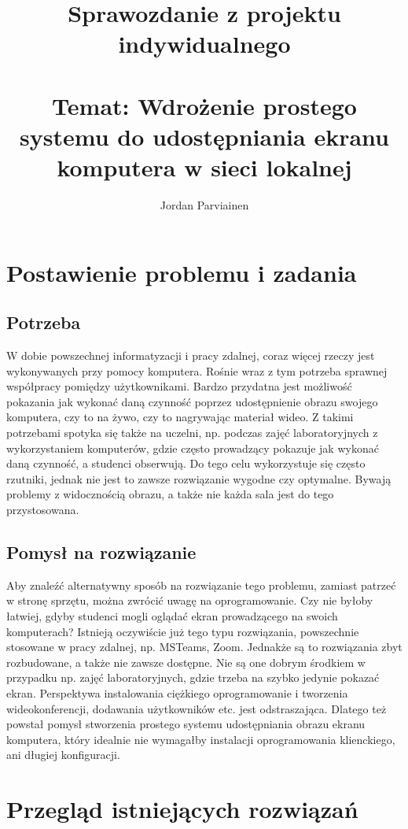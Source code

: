 \documentclass[a4paper,11pt]{article}
\title{%
    Sprawozdanie z projektu indywidualnego \\
    \ \\
    \large{Temat: Wdrożenie prostego systemu do udostępniania ekranu komputera w sieci lokalnej}}
\author{Jordan Parviainen}
\begin{document}
    \maketitle
    \newpage
    \section{Postawienie problemu i zadania}
        \subsection{Potrzeba}
        W dobie powszechnej informatyzacji i pracy zdalnej, coraz więcej rzeczy jest wykonywanych przy pomocy komputera. Rośnie wraz z tym potrzeba sprawnej współpracy pomiędzy użytkownikami.  
        Bardzo przydatna jest możliwość pokazania jak wykonać daną czynność poprzez udostępnienie obrazu swojego komputera, czy to na żywo, czy to nagrywając materiał wideo. 
        Z takimi potrzebami spotyka się także na uczelni, np. podczas zajęć laboratoryjnych z wykorzystaniem komputerów, gdzie często prowadzący pokazuje jak wykonać daną czynność, a studenci obserwują.
        Do tego celu wykorzystuje się często rzutniki, jednak nie jest to zawsze rozwiązanie wygodne czy optymalne. Bywają problemy z widocznością obrazu, a także nie każda sala jest do tego przystosowana.  
        \subsection{Pomysł na rozwiązanie}
        Aby znaleźć alternatywny sposób na rozwiązanie tego problemu, zamiast patrzeć w stronę sprzętu, można zwrócić uwagę na oprogramowanie. Czy nie byłoby łatwiej, gdyby studenci mogli oglądać ekran prowadzącego na swoich komputerach?
        Istnieją oczywiście już tego typu rozwiązania, powszechnie stosowane w pracy zdalnej, np. MSTeams, Zoom. Jednakże są to rozwiązania zbyt rozbudowane, a także nie zawsze dostępne. Nie są one dobrym środkiem 
        w przypadku np. zajęć laboratoryjnych, gdzie trzeba na szybko jedynie pokazać ekran. Perspektywa instalowania ciężkiego oprogramowanie i tworzenia wideokonferencji, dodawania użytkowników etc. jest odstraszająca.
        Dlatego też powstał pomysł stworzenia prostego systemu udostępniania obrazu ekranu komputera, który idealnie nie wymagałby instalacji oprogramowania klienckiego, ani długiej konfiguracji. 
    \section{Przegląd istniejących rozwiązań}
\end{document}
